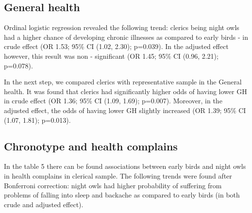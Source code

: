 \documentclass[ijerph,article,accept,moreauthors,pdftex]{mdpi}
\begin{document}
\hypertarget{general-health}{%
\subsection{General health}\label{general-health}}

Ordinal logistic regression revealed the following trend: clerics being
night owls had a higher chance of developing chronic illnesses as
compared to early birds - in crude effect (OR 1.53; 95\% CI (1.02,
2.30); p=0.039). In the adjusted effect however, this result was non -
significant (OR 1.45; 95\% CI (0.96, 2.21); p=0.078).

In the next step, we compared clerics with representative sample in the
General health. It was found that clerics had significantly higher odds
of having lower GH in crude effect (OR 1.36; 95\% CI (1.09, 1.69);
p=0.007). Moreover, in the adjusted effect, the odds of having lower GH
slightly increased (OR 1.39; 95\% CI (1.07, 1.81); p=0.013).

\hypertarget{chronotype-and-health-complains}{%
\subsection{Chronotype and health
complains}\label{chronotype-and-health-complains}}

In the table 5 there can be found associations between early birds and
night owls in health complains in clerical sample. The following trends
were found after Bonferroni correction: night owls had higher
probability of suffering from problems of falling into sleep and
backache as compared to early birds (in both crude and adjusted effect).
\end{document}
